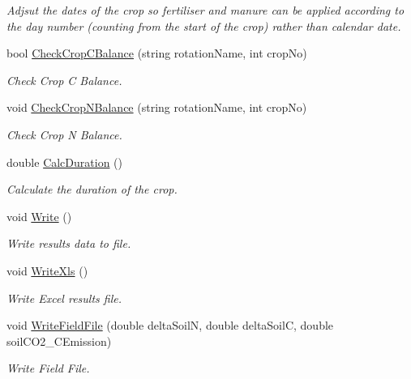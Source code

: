 \begin{DoxyCompactItemize}
\begin{DoxyCompactList}\small\item\em Adjsut the dates of the crop so fertiliser and manure can be applied according to the day number (counting from the start of the crop) rather than calendar date. \end{DoxyCompactList}\item 
bool \mbox{\hyperlink{class_crop_class_adaf339a54eea1a6f2682cefde6a68f01}{Check\+Crop\+C\+Balance}} (string rotation\+Name, int crop\+No)
\begin{DoxyCompactList}\small\item\em Check Crop C Balance. \end{DoxyCompactList}\item 
void \mbox{\hyperlink{class_crop_class_a46553cb55d0d0226d8466727d9cc13a1}{Check\+Crop\+N\+Balance}} (string rotation\+Name, int crop\+No)
\begin{DoxyCompactList}\small\item\em Check Crop N Balance. \end{DoxyCompactList}\item 
double \mbox{\hyperlink{class_crop_class_a53b9157a06bc1572e964e8edb6088a0f}{Calc\+Duration}} ()
\begin{DoxyCompactList}\small\item\em Calculate the duration of the crop. \end{DoxyCompactList}\item 
void \mbox{\hyperlink{class_crop_class_adcbe888b5ffd4a000e7d45daece3fe84}{Write}} ()
\begin{DoxyCompactList}\small\item\em Write results data to file. \end{DoxyCompactList}\item 
void \mbox{\hyperlink{class_crop_class_a9b6470304a1df61191f447da2692276c}{Write\+Xls}} ()
\begin{DoxyCompactList}\small\item\em Write Excel results file. \end{DoxyCompactList}\item 
void \mbox{\hyperlink{class_crop_class_a445f68063e9c6afd665b228c488b786b}{Write\+Field\+File}} (double delta\+SoilN, double delta\+SoilC, double soil\+C\+O2\+\_\+\+C\+Emission)
\begin{DoxyCompactList}\small\item\em Write Field File. \end{DoxyCompactList}\item 

\end{DoxyCompactItemize}
